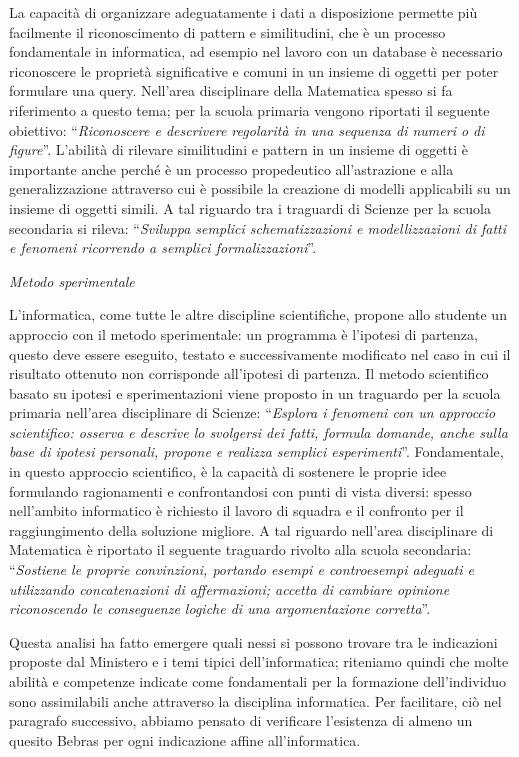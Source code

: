 \documentclass[12pt]{report}
\begin{document}
\noindent La capacità di organizzare adeguatamente i dati a disposizione permette più facilmente il riconoscimento di pattern e similitudini, che è un processo fondamentale in informatica, ad esempio nel lavoro con un database è necessario riconoscere le proprietà significative e comuni in un insieme di oggetti per poter formulare una query.
Nell'area disciplinare della Matematica spesso si fa riferimento a questo tema; per la scuola primaria vengono riportati il seguente obiettivo: ``\textit{Riconoscere e descrivere regolarità in una sequenza di numeri o di figure}''.
L'abilità di rilevare similitudini e pattern in un insieme di oggetti è importante anche perché è un processo propedeutico all'astrazione e alla generalizzazione attraverso cui è possibile la creazione di modelli applicabili su un insieme di oggetti simili. A tal riguardo tra i traguardi di Scienze per la scuola secondaria si rileva: ``\textit{Sviluppa semplici schematizzazioni e modellizzazioni di fatti e fenomeni ricorrendo a semplici formalizzazioni}''.

\bigskip
\textit{Metodo sperimentale}

\noindent L'informatica, come tutte le altre discipline scientifiche, propone allo studente un approccio con il metodo sperimentale: un programma è l'ipotesi di partenza, questo deve essere eseguito, testato e successivamente modificato nel caso in cui il risultato ottenuto non corrisponde all'ipotesi di partenza.
Il metodo scientifico basato su ipotesi e sperimentazioni viene proposto in un traguardo per la scuola primaria nell'area disciplinare di Scienze: ``\textit{Esplora i fenomeni con un approccio scientifico: osserva e descrive lo svolgersi dei fatti, formula domande, anche sulla base di ipotesi personali, propone e realizza semplici esperimenti}''.
Fondamentale, in questo approccio scientifico, è la capacità di sostenere le proprie idee formulando ragionamenti e confrontandosi con punti di vista diversi: spesso nell'ambito informatico è richiesto il lavoro di squadra e il confronto per il raggiungimento della soluzione migliore. A tal riguardo nell'area disciplinare di Matematica è riportato il seguente traguardo rivolto alla scuola secondaria: ``\textit{Sostiene le proprie convinzioni, portando esempi e controesempi adeguati e utilizzando concatenazioni di affermazioni; accetta di cambiare opinione riconoscendo le conseguenze logiche di una argomentazione corretta}''.



\bigskip
Questa analisi ha fatto emergere quali nessi si possono trovare tra le indicazioni proposte dal Ministero e i temi tipici dell'informatica; riteniamo quindi che molte abilità e competenze indicate come fondamentali per la formazione dell'individuo sono assimilabili anche attraverso la disciplina informatica. Per facilitare, ciò nel paragrafo successivo, abbiamo pensato di verificare l'esistenza di almeno un quesito Bebras per ogni indicazione affine all'informatica.
\end{document}
